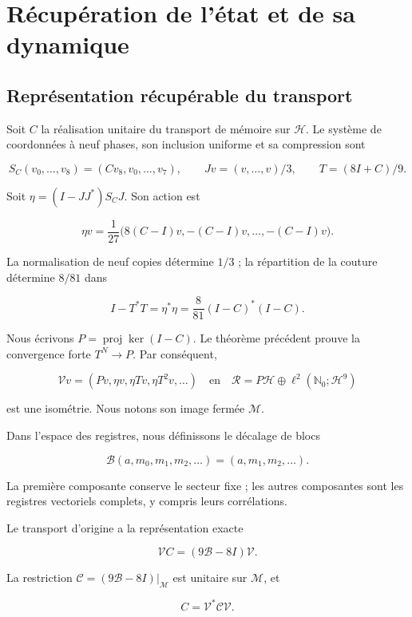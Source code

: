 \section{Récupération de l’état et de sa dynamique}
\label{nuclear:3}
\subsection{Représentation récupérable du transport}

Soit \(C\) la réalisation unitaire du transport de mémoire sur \(\mathcal H\). Le système de coordonnées à neuf phases, son inclusion uniforme et sa compression sont

\[
S_C(v_0,\ldots,v_8)=(Cv_8,v_0,\ldots,v_7),\qquad
Jv=(v,\ldots,v)/3,\qquad T=(8I+C)/9.
\]

Soit \(\eta=(I-JJ^*)S_CJ\). Son action est

\[
\eta v=\frac1{27}\bigl(8(C-I)v,-(C-I)v,\ldots,-(C-I)v\bigr).
\]

La normalisation de neuf copies détermine \(1/3\) ; la répartition de la couture détermine \(8/81\) dans

\begin{equation}
I-T^*T=\eta^*\eta=\frac8{81}(I-C)^*(I-C).
\label{nuc03:eq:1}
\end{equation}

Nous écrivons \(P=\operatorname{proj}\ker(I-C)\). Le théorème précédent prouve la convergence forte \(T^N\to P\). Par conséquent,

\begin{equation}
\mathcal Vv=(Pv,\eta v,\eta Tv,\eta T^2v,\ldots)
\quad\text{en}\quad
\mathcal R=P\mathcal H\oplus\ell^2(\mathbb N_0;\mathcal H^9)
\label{nuc03:eq:2}
\end{equation}

est une isométrie. Nous notons son image fermée \(\mathcal M\).

Dans l’espace des registres, nous définissons le décalage de blocs


\begin{equation}
\mathcal B(a,m_0,m_1,m_2,\ldots)=(a,m_1,m_2,\ldots).
\label{nuc03:eq:3}
\end{equation}

La première composante conserve le secteur fixe ; les autres composantes sont les registres vectoriels complets, y compris leurs corrélations.

\begin{theorem}
\label{nuc03:transporte}
Le transport d’origine a la représentation exacte

\begin{equation}
\boxed{\mathcal V C=(9\mathcal B-8I)\mathcal V.}
\label{nuc03:eq:4}
\end{equation}

La restriction \(\mathcal C=(9\mathcal B-8I)|_{\mathcal M}\) est unitaire sur \(\mathcal M\), et


\begin{equation}
C=\mathcal V^*\mathcal C\mathcal V.
\label{nuc03:eq:5}
\end{equation}
\end{theorem}

